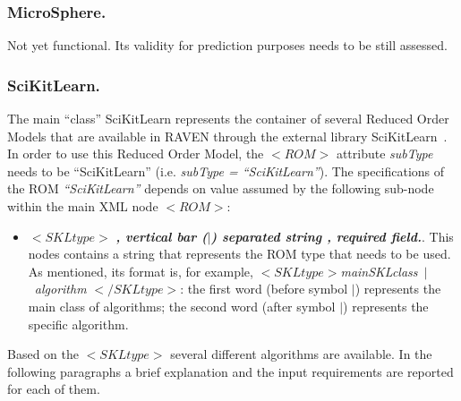 \subsubsection{MicroSphere.}
\label{subsubsec:microSphere}
Not yet functional. Its validity for prediction purposes  needs to be still assessed.
\subsubsection{SciKitLearn.}
\label{subsubsec:SciKitLearn}
The main ``class'' SciKitLearn represents the container of several Reduced Order Models that are available in RAVEN through the external library SciKitLearn~\cite{SciKitLearn}.
\\In order to use this Reduced Order Model, the $<ROM>$ attribute \textit{subType} needs to be ``SciKitLearn'' (i.e. \textit{subType = ``SciKitLearn''}). The specifications of the ROM \textit{``SciKitLearn''} depends on value assumed by the following sub-node within the main XML node $<ROM>$:
\begin{itemize}
\item $<SKLtype>$ \textbf{\textit{, vertical bar ($\vert$) separated string , required field.}}. This nodes contains a string that represents the ROM type that needs to be used. As mentioned, its format is, for example, $<SKLtype>$\textit{mainSKLclass}~$\vert$~\textit{algorithm} $</SKLtype>$: the first word (before symbol $\vert$) represents the main class of algorithms; the second word (after symbol $\vert$) represents the specific algorithm.
\end{itemize}
Based on the $<SKLtype>$ several different algorithms are available. In the following paragraphs a brief explanation and the input requirements are reported for each of them.
